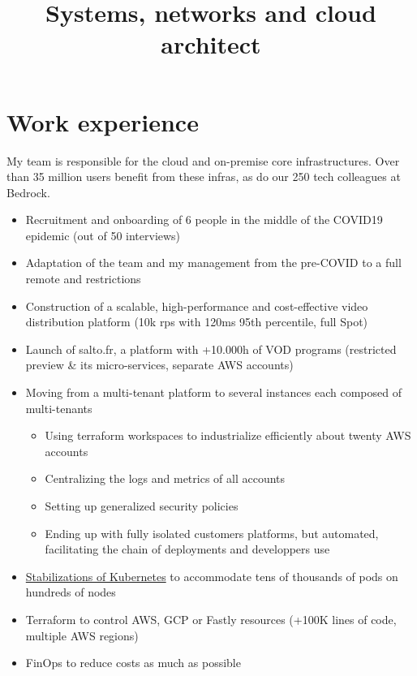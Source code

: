\documentclass[12pt,a4paper,roman]{moderncv}          %
\title{Systems, networks and cloud architect}
\begin{document}
\makecvtitle


\section{Work experience}

{My team is responsible for the cloud and on-premise core infrastructures. Over than 35 million users benefit from these infras, as do our 250 tech colleagues at Bedrock.
\begin{itemize}
  \item Recruitment and onboarding of 6 people in the middle of the COVID19 epidemic (out of 50 interviews)
  \item Adaptation of the team and my management from the pre-COVID to a full remote and restrictions
  \item Construction of a scalable, high-performance and cost-effective video distribution platform (10k rps with 120ms 95th percentile, full Spot)
  \item Launch of salto.fr, a platform with +10.000h of VOD programs (restricted preview \& its micro-services, separate AWS accounts)
  \item Moving from a multi-tenant platform to several instances each composed of multi-tenants
  \begin{itemize}
    \item Using terraform workspaces to industrialize efficiently about twenty AWS accounts
    \item Centralizing the logs and metrics of all accounts
    \item Setting up generalized security policies
    \item Ending up with fully isolated customers platforms, but automated, facilitating the chain of deployments and developpers use
  \end{itemize}
  \item \href{https://tech.bedrockstreaming.com/Three-years-running-kubernetes-on-production-at-Bedrock/}{\color{blue}Stabilizations of Kubernetes} to accommodate tens of thousands of pods on hundreds of nodes
  \item Terraform to control AWS, GCP or Fastly resources (+100K lines of code, multiple AWS regions)
  \item FinOps to reduce costs as much as possible

\end{itemize}}
\end{document}
